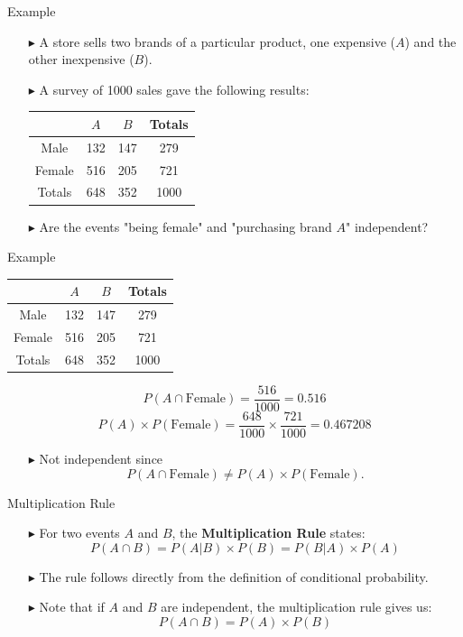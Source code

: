 \documentclass[12pt]{beamer}
\begin{document}
\begin{frame}{Example}
	\begin{itemize}
		\item[\color{blue}$\blacktriangleright$] A store sells two brands of a particular product, one expensive ($A$) and the other inexpensive ($B$).
		\item[\color{blue}$\blacktriangleright$] A survey of 1000 sales gave the following results:
	\begin{center}
		\begin{tabular}{cccc}
			\toprule
			&$A$&$B$&Totals\\
			\hline
			Male&132&147&279\\
			Female&516&205&721\\
			\hline
			Totals&648&352&1000\\
			\bottomrule
		\end{tabular}
	\end{center}
	\item[\color{blue}$\blacktriangleright$] Are the events "being female" and "purchasing brand $A$" independent?
	\end{itemize}
\end{frame}
\begin{frame}{Example}
		\begin{center}
			\begin{tabular}{cccc}
				\toprule
				&$A$&$B$&Totals\\
				\hline
				Male&132&147&279\\
				Female&516&205&721\\
				\hline
				Totals&648&352&1000\\
				\bottomrule
			\end{tabular}
		\end{center}
		$$P(A\cap \text{Female})=\frac{516}{1000}=0.516$$
		$$P(A)\times P(\text{Female})=\frac{648}{1000}\times\frac{721}{1000}=0.467208$$
	\begin{itemize}
		\item[\color{blue}$\blacktriangleright$] Not independent since
		$$P(A\cap \text{Female})\ne P(A)\times P(\text{Female}).$$
	\end{itemize}
\end{frame}
\begin{frame}{Multiplication Rule}
	\begin{itemize}
		\item[\color{blue}$\blacktriangleright$] For two events $A$ and $B$, the {\bf Multiplication Rule} states:
		$$P(A\cap B)=P(A|B)\times P(B)=P(B|A)\times P(A)$$
		\item[\color{blue}$\blacktriangleright$] The rule follows directly from the definition of conditional probability.
		\item[\color{blue}$\blacktriangleright$] Note that if $A$ and $B$ are independent, the multiplication rule gives us:
		$$P(A\cap B)=P(A)\times P(B)$$
	\end{itemize}
\end{frame}
\end{document}
